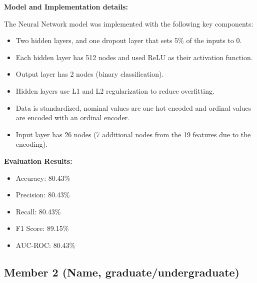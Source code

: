 \documentclass[11pt,a4paper]{article}
\begin{document}
\begin{tcolorbox}[
        title=Neural Network Implementation,
        colback=lightblue!30,
        colframe=darkblue,
        boxrule=0.5pt,
        fonttitle=\bfseries\sffamily\footnotesize,
        fontupper=\footnotesize
    ]
    \textbf{Model and Implementation details:}

    The Neural Network model was implemented with the following key components:
    \begin{itemize}[leftmargin=*, itemsep=2pt, parsep=0pt]
        \item Two hidden layers, and one dropout layer that sets 5\% of the inputs to 0.
        \item Each hidden layer has 512 nodes and used ReLU as their activation function.
        \item Output layer has 2 nodes (binary classification).
        \item Hidden layers use L1 and L2 regularization to reduce overfitting.
        \item Data is standardized, nominal values are one hot encoded and ordinal values are encoded with an ordinal encoder. 
        \item Input layer has 26 nodes (7 additional nodes from the 19 features due to the encoding). 
    \end{itemize}

    \textbf{Evaluation Results:}
    \begin{itemize}[leftmargin=*, itemsep=2pt, parsep=0pt]
        \item Accuracy: 80.43\%
        \item Precision: 80.43\%
        \item Recall: 80.43\%
        \item F1 Score: 89.15\%
        \item AUC-ROC: 80.43\%
    \end{itemize}
\end{tcolorbox}

\subsection{Member 2 (Name, graduate/undergraduate)}
\end{document}
